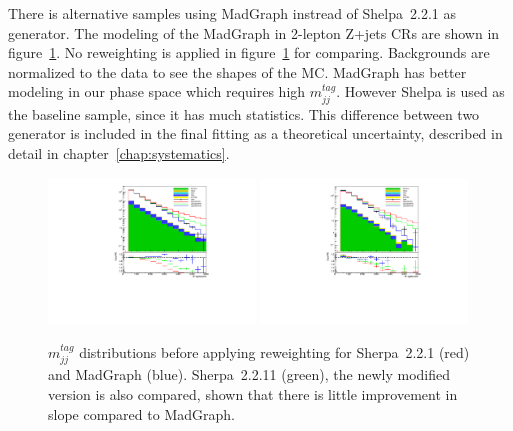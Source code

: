 There is alternative samples using MadGraph instread of Shelpa~2.2.1 as generator. 
The modeling of the MadGraph in 2-lepton Z+jets CRs are shown in figure~\ref{fig:SherpaMadGraph}. No reweighting is applied in figure~\ref{fig:SherpaMadGraph} for comparing. 
Backgrounds are normalized to the data to see the shapes of the MC. 
MadGraph has better modeling in our phase space which requires high $m^{tag}_{jj}$. 
However Shelpa is used as the baseline sample, since it has much statistics.
This difference between two generator is included in the final fitting as a theoretical uncertainty, described in detail in chapter~\ref{chap:systematics}.
\begin{figure}[ht]
    \centering
    \includegraphics[width=0.49\textwidth]{figures/2lep/reweighting/MTagResJets_0ptag2pjet_0ptv_CRVjet_ratio.pdf}
    \includegraphics[width=0.49\textwidth]{figures/2lep/reweighting/MTagMerJets_0ptag1pfat0pjet_0ptv_CRVjet_ratio.pdf}
    \caption{ $m^{tag}_{jj}$ distributions before applying reweighting for Sherpa~2.2.1 (red) and MadGraph (blue). Sherpa~2.2.11 (green), the newly modified version is also compared, shown that there is little improvement in slope compared to MadGraph.}
    \label{fig:SherpaMadGraph}
\end{figure}


